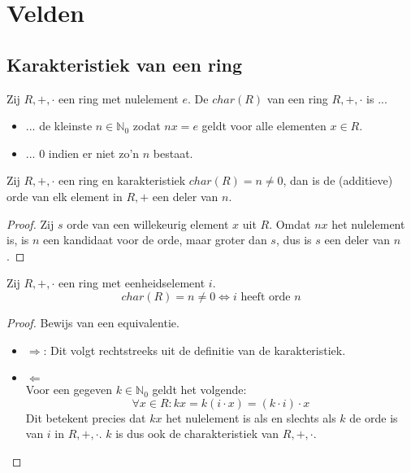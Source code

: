 \documentclass[main.tex]{subfiles}
\begin{document}
\chapter{Velden}
\label{cha:velden}

\section{Karakteristiek van een ring}
\label{sec:karakt-van-een}

\begin{de}
  Zij $R,+,\cdot$ een ring met nulelement $e$.
  De  $char(R)$ van een ring $R,+,\cdot$ is ...
  \begin{itemize}
  \item ... de kleinste $n\in \mathbb{N}_{0}$ zodat $nx=e$ geldt voor alle elementen $x\in R$.
  \item ... $0$ indien er niet zo'n $n$ bestaat.
  \end{itemize}
\end{de} 

\begin{ei}
  Zij $R,+,\cdot$ een ring  en karakteristiek $char(R) = n \neq 0$, dan is de (additieve) orde van elk element in $R,+$ een deler van $n$.

  \begin{proof}
    Zij $s$ orde van een willekeurig element $x$ uit $R$.
    Omdat $nx$ het nulelement is, is $n$ een kandidaat voor de orde, maar groter dan $s$, dus is $s$ een deler van $n$.
  \end{proof}
\end{ei}

\begin{st}
  \label{st:eenheidselement-orde-karakteristiek}
  Zij $R,+,\cdot$ een ring met eenheidselement $i$.
  \[ char(R) = n \neq 0 \Leftrightarrow i \text{ heeft orde } n \]

  \begin{proof}
    Bewijs van een equivalentie.
    \begin{itemize}
    \item $\Rightarrow$: Dit volgt rechtstreeks uit de definitie van de karakteristiek.
    \item $\Leftarrow$\\
      Voor een gegeven $k\in \mathbb{N}_{0}$ geldt het volgende:
      \[ \forall x \in R: kx = k(i\cdot x) = (k \cdot i) \cdot x \]
      Dit betekent precies dat $kx$ het nulelement is als en slechts als $k$ de orde is van $i$ in $R,+,\cdot$.
      $k$ is dus ook de charakteristiek van $R,+,\cdot$.
    \end{itemize}
  \end{proof}
\end{st}
\end{document}
